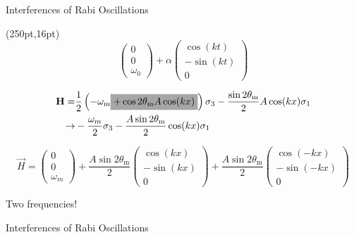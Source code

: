 \documentclass[9pt]{beamer}
\begin{document}
\begin{darkframes}
\begin{frame}{Interferences of Rabi Oscillations}
\begin{textblock*}{10pt}(250pt,16pt)
\small
\begin{equation*}
\begin{pmatrix}
0\\
0\\
\omega_0
\end{pmatrix} +  \alpha\begin{pmatrix}
 \cos(kt) \\
- \sin(kt) \\
0
\end{pmatrix}
\end{equation*}
\end{textblock*}


\begin{align*}
    \mathbf {H} =& \frac{1}{2}\left( - \omega_{\mathrm{m}} \colorbox{gray!70}{$+  \cos 2\theta_{\mathrm{m}}A\cos(kx) $} \right) \sigma_3 - \frac{  \sin 2\theta_{\mathrm{m} }  }{2}A \cos(kx)  \sigma_1\\
    \to& -\frac{\omega_m}{2} \sigma_3 - \frac{A\sin 2\theta_{\mathrm m}}{2} \cos(kx)\sigma_1
\end{align*}

\begin{equation*}
    \vec H = \begin{pmatrix}
    0\\
    0\\
    \omega_m
    \end{pmatrix} + \frac{A\sin 2\theta_{\mathrm m}}{2}\begin{pmatrix}
     \cos(kx)\\
    -\sin(kx)\\
    0
    \end{pmatrix} + \frac{A\sin 2\theta_{\mathrm m}}{2}\begin{pmatrix}
    \cos(-kx)\\
    -\sin(-kx)\\
    0
    \end{pmatrix}
\end{equation*}

\begin{tcolorbox}
\centering
Two frequencies!
\end{tcolorbox}


\end{frame}





\begin{frame}{Interferences of Rabi Oscillations}



\end{frame}
\end{darkframes}
\end{document}
